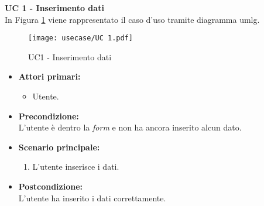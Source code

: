 \noindent \textbf{\large UC 1 - Inserimento dati}\\[0.2cm]
\label{uc:inserimento-dati}
\noindent In Figura \ref{use-case-1} viene rappresentato il caso d'uso tramite diagramma \gls{umlg}.
\begin{figure}[!h] 
    \centering 
    \texttt{[image: usecase/UC 1.pdf]} 
    \caption{UC1 - Inserimento dati}
	\label{use-case-1}
\end{figure}
\begin{itemize}

	\item \textbf{Attori primari: }
		\begin{itemize}
			\item Utente.
		\end{itemize}

	\item \textbf{Precondizione: }\\[0.3cm]
		L'utente è dentro la \textit{form} e non ha ancora inserito alcun dato.

	\item \textbf{Scenario principale: }
		\begin{enumerate}
			\item L'utente inserisce i dati.
		\end{enumerate}
		

	\item \textbf{Postcondizione: }\\[0.3cm]
		L'utente ha inserito i dati correttamente.

\end{itemize}

\vspace{0.4cm}

